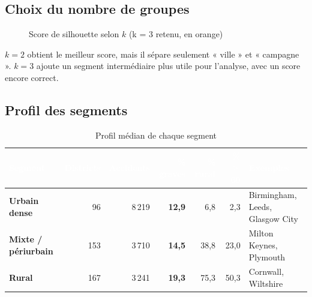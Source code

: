 \documentclass[11pt,a4paper]{report}
\newcommand{\hd}[1]{\textcolor{white}{\bfseries #1}}
\newcommand{\headrow}{\rowcolor{primary}}
\begin{document}
\subsection{Choix du nombre de groupes}

\begin{figure}[H]
\centering
{}
\caption{Score de silhouette selon $k$ (k = 3 retenu, en orange)}
\end{figure}

$k = 2$ obtient le meilleur score, mais il sépare seulement « ville » et « campagne ». \textbf{$k = 3$} ajoute un segment intermédiaire plus utile pour l'analyse, avec un score encore correct.

\subsection{Profil des segments}

\begin{table}[H]
\centering
\small
{}
\begin{tabularx}{\textwidth}{@{}l r r r r r X@{}}
\toprule
\headrow \hd{Segment} & \hd{Districts} & \hd{Accidents} & \hd{\% graves} & \hd{\% rural} & \hd{\% $\geq$ 60} & \hd{Exemples} \\
\midrule
\textbf{Urbain dense} & 96 & 8\,219 & \textbf{12,9} & 6,8 & 2,3 & Birmingham, Leeds, Glasgow City \\
\textbf{Mixte / périurbain} & 153 & 3\,710 & \textbf{14,5} & 38,8 & 23,0 & Milton Keynes, Plymouth \\
\textbf{Rural} & 167 & 3\,241 & \textbf{19,3} & 75,3 & 50,3 & Cornwall, Wiltshire \\
\bottomrule
\end{tabularx}
\caption{Profil médian de chaque segment}
\end{table}
\end{document}
